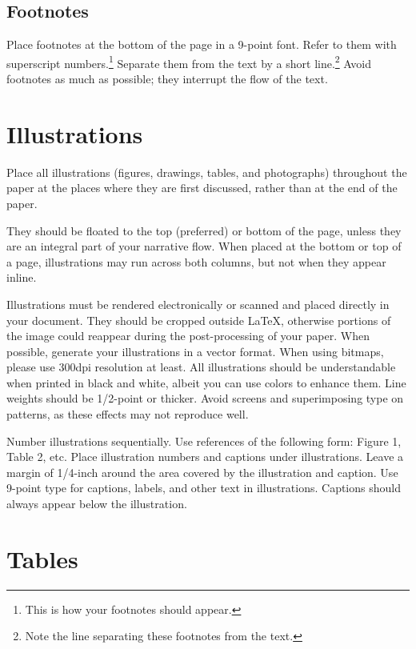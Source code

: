 \documentclass{article}
\begin{document}
\subsection{Footnotes}

Place footnotes at the bottom of the page in a 9-point font.  Refer to
them with superscript numbers.\footnote{This is how your footnotes
    should appear.} Separate them from the text by a short
line.\footnote{Note the line separating these footnotes from the
    text.} Avoid footnotes as much as possible; they interrupt the flow of
the text.

\section{Illustrations}

Place all illustrations (figures, drawings, tables, and photographs)
throughout the paper at the places where they are first discussed,
rather than at the end of the paper.

They should be floated to the top (preferred) or bottom of the page,
unless they are an integral part
of your narrative flow. When placed at the bottom or top of
a page, illustrations may run across both columns, but not when they
appear inline.

Illustrations must be rendered electronically or scanned and placed
directly in your document. They should be cropped outside \LaTeX{},
otherwise portions of the image could reappear during the post-processing of your paper.
When possible, generate your illustrations in a vector format.
When using bitmaps, please use 300dpi resolution at least.
All illustrations should be understandable when printed in black and
white, albeit you can use colors to enhance them. Line weights should
be 1/2-point or thicker. Avoid screens and superimposing type on
patterns, as these effects may not reproduce well.

Number illustrations sequentially. Use references of the following
form: Figure 1, Table 2, etc. Place illustration numbers and captions
under illustrations. Leave a margin of 1/4-inch around the area
covered by the illustration and caption.  Use 9-point type for
captions, labels, and other text in illustrations. Captions should always appear below the illustration.

\section{Tables}
\end{document}
